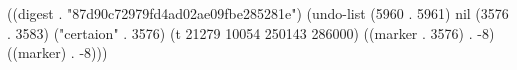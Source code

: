 
((digest . "87d90c72979fd4ad02ae09fbe285281e") (undo-list (5960 . 5961) nil (3576 . 3583) ("certaion" . 3576) (t 21279 10054 250143 286000) ((marker . 3576) . -8) ((marker) . -8)))

